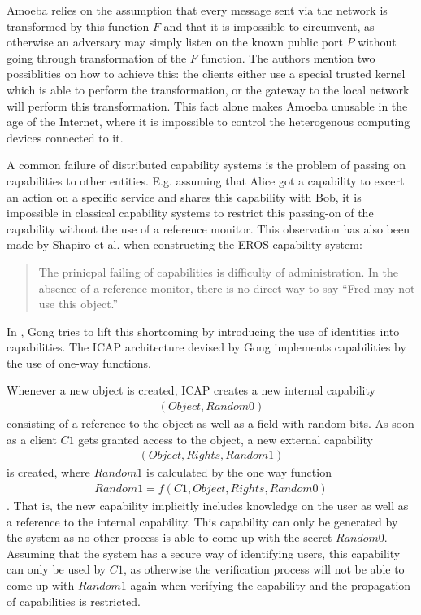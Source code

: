 Amoeba relies on the assumption that every message sent via the network is transformed by this function $F$ and that it is impossible to circumvent, as otherwise an adversary may simply listen on the known public port $P$ without going through transformation of the $F$ function.
The authors mention two possiblities on how to achieve this: the clients either use a special trusted kernel which is able to perform the transformation, or the gateway to the local network will perform this transformation.
This fact alone makes Amoeba unusable in the age of the Internet, where it is impossible to control the heterogenous computing devices connected to it.

A common failure of distributed capability systems is the problem of passing on capabilities to other entities.
E.g. assuming that Alice got a capability to excert an action on a specific service and shares this capability with Bob, it is impossible in classical capability systems to restrict this passing-on of the capability without the use of a reference monitor.
This observation has also been made by Shapiro et al. when constructing the EROS capability system:
\begin{quote}
    The prinicpal failing of capabilities is difficulty of administration.
    In the absence of a reference monitor, there is no direct way to say ``Fred may not use this object.'' \cite{shapiro1999eros}
\end{quote}

In \cite{gong1989secure}, Gong tries to lift this shortcoming by introducing the use of identities into capabilities.
The ICAP architecture devised by Gong implements capabilities by the use of one-way functions.

Whenever a new object is created, ICAP creates a new internal capability
\begin{align*}
    (Object, Random0)
\end{align*}
consisting of a reference to the object as well as a field with random bits.
As soon as a client $C1$ gets granted access to the object, a new external capability
\begin{align*}
    (Object, Rights, Random1)
\end{align*}
is created, where $Random1$ is calculated by the one way function
\begin{align*}
    Random1 = f(C1, Object, Rights, Random0)
\end{align*}.
That is, the new capability implicitly includes knowledge on the user as well as a reference to the internal capability.
This capability can only be generated by the system as no other process is able to come up with the secret $Random0$.
Assuming that the system has a secure way of identifying users, this capability can only be used by $C1$, as otherwise the verification process will not be able to come up with $Random1$ again when verifying the capability and the propagation of capabilities is restricted.

